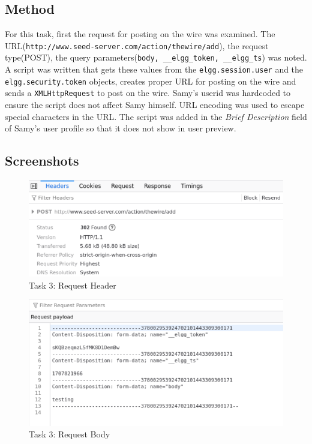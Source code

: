 \documentclass[a4paper, 11pt, oneside]{article} %
\begin{document}
\subsection{Method}
For this task, first the request for posting on the wire was examined. The URL(\texttt{http://www.seed-server.com/action/thewire/add}), the request type(POST), the query parameters(\texttt{body, \_\_elgg\_token, \_\_elgg\_ts}) was noted. A script was written that gets these values from the \texttt{elgg.session.user} and the \texttt{elgg.security.token} objects, creates proper URL for posting on the wire and sends a \texttt{XMLHttpRequest} to post on the wire. Samy's userid was hardcoded to ensure the script does not affect Samy himself. URL encoding was used to escape special characters in the URL. The script was added in the \textit{Brief Description} field of Samy's user profile so that it does not show in user preview.
\subsection{Screenshots}
\begin{figure}[H]
    \includegraphics[width = 0.95\linewidth, center]{img/task3/3a.png}
    \caption{Task 3: Request Header}
    \label{fig:task3a}
\end{figure}
\begin{figure}[H]
    \includegraphics[width = 0.95\linewidth, center]{img/task3/3b.png}
    \caption{Task 3: Request Body}
    \label{fig:task3b}
\end{figure}
\end{document}
